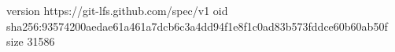 version https://git-lfs.github.com/spec/v1
oid sha256:93574200aedae61a461a7dcb6c3a4dd94f1e8f1c0ad83b573fddce60b60ab50f
size 31586

